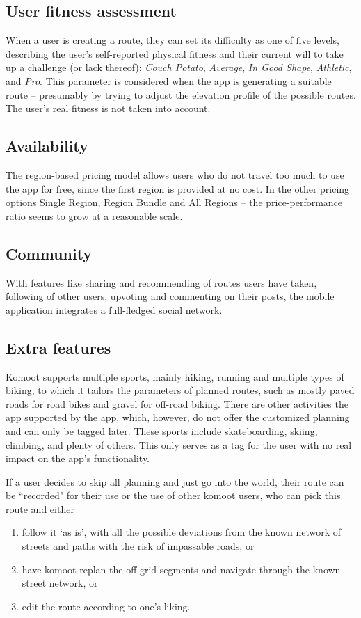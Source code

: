 \subsection*{User fitness assessment}
When a user is creating a route, they can set its difficulty as one of five levels, 
describing the user's self-reported physical fitness and their current will to take up a challenge (or lack thereof): \textit{Couch Potato}, \textit{Average}, \textit{In Good Shape}, \textit{Athletic}, and \textit{Pro}.
This parameter is considered when the app is generating a suitable route -- presumably by trying to adjust the elevation profile of the possible routes.
The user's real fitness is not taken into account.

\subsection*{Availability}
The region-based pricing model allows users who do not travel too much to use the app for free,
since the first region is provided at no cost.
In the other pricing options Single Region, Region Bundle and All Regions -- the price-performance ratio seems to grow at a reasonable scale.
\subsection*{Community}
With features like sharing and recommending of routes users have taken, following of other users, upvoting and commenting on their posts, the mobile application integrates a full-fledged social network.
\subsection*{Extra features}
Komoot supports multiple sports, mainly hiking, running and multiple types of biking, to which it tailors the parameters of planned routes, such as mostly paved roads for road bikes and gravel for off-road biking.
There are other activities the app supported by the app, which, however, do not offer the customized planning and can only be tagged later.
These sports include skateboarding, skiing, climbing, and plenty of others.
This only serves as a tag for the user with no real impact on the app's functionality.

If a user decides to skip all planning and just go into the world, their route can be ``recorded" for their use or the use of other komoot users, who can pick this route and either

\begin{enumerate}[label=\alph*)]
    \item follow it `as is', with all the possible deviations from the known network of streets and paths with the risk of impassable roads, or
    \item have komoot replan the off-grid segments and navigate through the known street network, or
    \item edit the route according to one's liking.
\end{enumerate}

